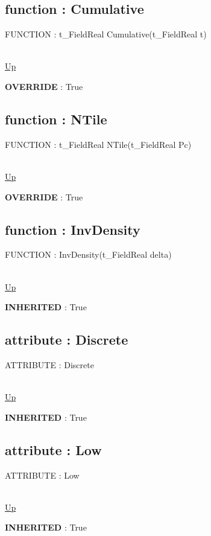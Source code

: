 \subsection*{function : Cumulative}
\hypertarget{ecldoc:linearregression.ols.distributionbase.cumulative}{FUNCTION : t\_FieldReal Cumulative(t\_FieldReal t)} \\
\hyperlink{ecldoc:linearregression.ols.fdistribution}{Up} \\
\par
\textbf{OVERRIDE} : True \\
\subsection*{function : NTile}
\hypertarget{ecldoc:linearregression.ols.distributionbase.ntile}{FUNCTION : t\_FieldReal NTile(t\_FieldReal Pc)} \\
\hyperlink{ecldoc:linearregression.ols.fdistribution}{Up} \\
\par
\textbf{OVERRIDE} : True \\
\subsection*{function : InvDensity}
\hypertarget{ecldoc:linearregression.ols.distributionbase.invdensity}{FUNCTION : InvDensity(t\_FieldReal delta)} \\
\hyperlink{ecldoc:linearregression.ols.fdistribution}{Up} \\
\par
\textbf{INHERITED} : True \\
\subsection*{attribute : Discrete}
\hypertarget{ecldoc:linearregression.ols.distributionbase.discrete}{ATTRIBUTE : Discrete} \\
\hyperlink{ecldoc:linearregression.ols.fdistribution}{Up} \\
\par
\textbf{INHERITED} : True \\
\subsection*{attribute : Low}
\hypertarget{ecldoc:linearregression.ols.fdistribution.low}{ATTRIBUTE : Low} \\
\hyperlink{ecldoc:linearregression.ols.fdistribution}{Up} \\
\par
\textbf{INHERITED} : True \\
